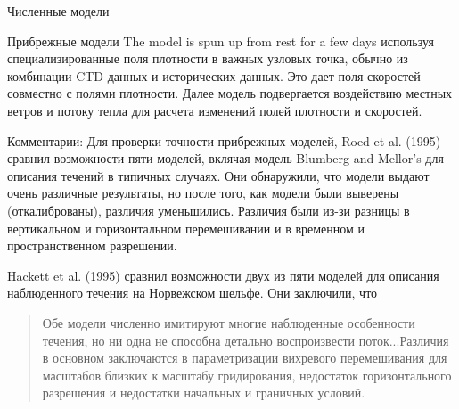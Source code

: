 \begin{chapter}{Численные модели}
\begin{section}{Прибрежные модели}
The model is spun up from rest for a few days используя
специализированные поля плотности в важных узловых точка, обычно из
комбинации CTD данных и исторических данных. Это дает поля скоростей
совместно с полями плотности. Далее модель подвергается воздействию
местных ветров и потоку тепла для расчета изменений полей плотности и
скоростей.
%

\begin{paragraph}{Комментарии:}
Для проверки точности прибрежных моделей, Roed et al. (1995) сравнил
возможности пяти моделей, вклячая модель Blumberg and Mellor's для
описания течений в типичных случаях. Они обнаружили, что модели выдают
очень различные результаты, но после того, как модели были выверены
(откалиброваны), различия уменьшились. Различия были из-зи разницы в
вертикальном и горизонтальном перемешивании и в временном и
пространственном разрешении.
% 

Hackett et al. (1995) сравнил возможности двух из пяти моделей для
описания наблюденного течения на Норвежском шельфе. Они заключили, что
%
\begin{quote}
Обе модели численно имитируют многие наблюденные особенности течения,
но ни одна не способна детально воспроизвести поток...Различия в
основном заключаются в параметризации вихревого перемешивания для
масштабов близких к масштабу гридирования, недостаток горизонтального
разрешения и недостатки начальных и граничных условий.
%
\end{quote}
\end{paragraph}


\end{section}
\end{chapter}
